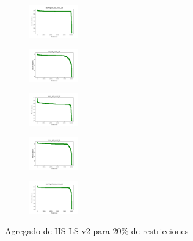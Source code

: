 \begin{figure}[H]
\begin{subfigure}
        \centering
        \includegraphics[width=0.234\textwidth]{img/HS-LS-v2/newthyroid_set_const_20_49258669_cost.png}
    \end{subfigure}
    \hfill
    \begin{subfigure}
        \centering
        \includegraphics[width=0.234\textwidth]{img/HS-LS-v2/iris_set_const_20_3773969821_cost.png}
    \end{subfigure}
    \hfill
    \begin{subfigure}
        \centering
        \includegraphics[width=0.234\textwidth]{img/HS-LS-v2/ecoli_set_const_20_3773969821_cost.png}
    \end{subfigure}
    \hfill
    \begin{subfigure}
        \centering
        \includegraphics[width=0.234\textwidth]{img/HS-LS-v2/rand_set_const_20_3773969821_cost.png}
    \end{subfigure}
    \hfill
    \begin{subfigure}
        \centering
        \includegraphics[width=0.234\textwidth]{img/HS-LS-v2/newthyroid_set_const_20_3773969821_cost.png}
    \end{subfigure}
    \caption{Agregado de HS-LS-v2 para 20\% de restricciones}
\end{figure}

\vspace*{\fill}
\newpage